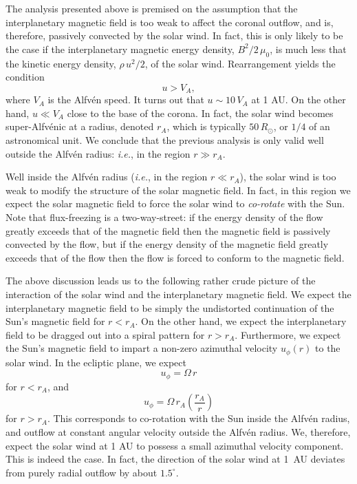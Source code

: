 The analysis presented above is premised on the assumption that the
interplanetary magnetic field is too weak to affect the coronal outflow, and
is, therefore, passively convected  by the solar wind. In fact, this is only
likely to be the case if the interplanetary 
magnetic energy density, $B^2/2\,\mu_0$, is
much less that the kinetic energy density, $\rho \,u^2/2$, of the solar wind.
Rearrangement yields the condition
\begin{equation}
u > V_A,
\end{equation}
where $V_A$ is the Alfv\'{e}n speed. It turns out that $u\sim 10\,V_A$ at
1 AU. On the other hand, $u\ll V_A$ close to the base of the
corona. In fact, the solar wind becomes super-Alfv\'{e}nic at a radius,
denoted $r_A$, which is typically $50\,R_\odot$, or $1/4$ of an
astronomical unit. We conclude that the previous analysis is only
valid well outside the Alfv\'{e}n radius: {\em i.e.}, in the region $r\gg r_A$.

Well inside the Alfv\'{e}n radius ({\em i.e.}, in the region $r\ll r_A$),
the solar wind is too weak to modify the structure of the solar magnetic field.
In fact, in this region we expect the solar  magnetic field to
force  the solar wind to
{\em co-rotate}\/ with the Sun. Note that flux-freezing is a two-way-street:
if the energy density of the flow greatly exceeds that of the magnetic field
then the magnetic field is passively convected by the flow, but if
the energy density of the magnetic field greatly exceeds that of the flow
then the flow is forced to conform to the magnetic field.

The above discussion leads us to the following rather crude picture of the
interaction of the solar wind and the interplanetary magnetic field.
We expect the interplanetary 
magnetic field to be simply the undistorted continuation of
the Sun's magnetic field for $r<r_A$. On the other hand, we
expect the interplanetary field to be dragged out into a spiral
pattern for $r>r_A$. Furthermore, we expect the Sun's magnetic field
to impart   a non-zero  azimuthal velocity $u_\phi(r)$ to the solar
wind. In the ecliptic plane, we expect
\begin{equation}
u_\phi = {\Omega}\,r
\end{equation}
for $r<r_A$, and
\begin{equation}
u_\phi = {\Omega}\,r_A\left(\frac{r_A}{r}\right)
\end{equation}
for $r>r_A$.
This corresponds to co-rotation with the Sun inside the Alfv\'{e}n radius,
and outflow at constant angular velocity outside the Alfv\'{e}n radius.
We, therefore, expect the solar wind at 1 AU to possess a small azimuthal
velocity component. This is indeed the case. In fact, the direction
of the solar wind at 1~AU
deviates from purely radial outflow by about $1.5^\circ$. 

